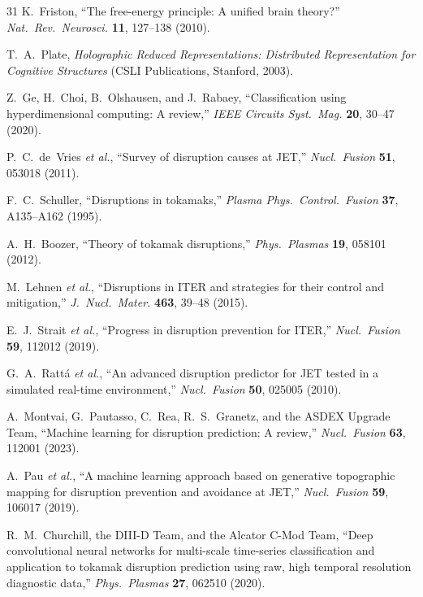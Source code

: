 \documentclass[twocolumn,prl,aps,superscriptaddress,floatfix]{revtex4-2}
\begin{document}
\begin{thebibliography}{31}
K.~Friston,
``The free-energy principle: A unified brain theory?''
\textit{Nat.\ Rev.\ Neurosci.} \textbf{11}, 127--138 (2010).

T.~A.~Plate,
\textit{Holographic Reduced Representations: Distributed Representation for Cognitive Structures}
(CSLI Publications, Stanford, 2003).

Z.~Ge, H.~Choi, B.~Olshausen, and J.~Rabaey,
``Classification using hyperdimensional computing: A review,''
\textit{IEEE Circuits Syst.\ Mag.} \textbf{20}, 30--47 (2020).

P.~C.~de~Vries \textit{et al.},
``Survey of disruption causes at JET,''
\textit{Nucl.\ Fusion} \textbf{51}, 053018 (2011).

F.~C.~Schuller,
``Disruptions in tokamaks,''
\textit{Plasma Phys.\ Control.\ Fusion} \textbf{37}, A135--A162 (1995).

A.~H.~Boozer,
``Theory of tokamak disruptions,''
\textit{Phys.\ Plasmas} \textbf{19}, 058101 (2012).

M.~Lehnen \textit{et al.},
``Disruptions in ITER and strategies for their control and mitigation,''
\textit{J.\ Nucl.\ Mater.} \textbf{463}, 39--48 (2015).

E.~J.~Strait \textit{et al.},
``Progress in disruption prevention for ITER,''
\textit{Nucl.\ Fusion} \textbf{59}, 112012 (2019).

G.~A.~Ratt\'a \textit{et al.},
``An advanced disruption predictor for JET tested in a simulated real-time environment,''
\textit{Nucl.\ Fusion} \textbf{50}, 025005 (2010).

A.~Montvai, G.~Pautasso, C.~Rea, R.~S.~Granetz, and the ASDEX Upgrade Team,
``Machine learning for disruption prediction: A review,''
\textit{Nucl.\ Fusion} \textbf{63}, 112001 (2023).

A.~Pau \textit{et al.},
``A machine learning approach based on generative topographic mapping for disruption prevention and avoidance at JET,''
\textit{Nucl.\ Fusion} \textbf{59}, 106017 (2019).

R.~M.~Churchill, the DIII-D Team, and the Alcator C-Mod Team,
``Deep convolutional neural networks for multi-scale time-series classification and application to tokamak disruption prediction using raw, high temporal resolution diagnostic data,''
\textit{Phys.\ Plasmas} \textbf{27}, 062510 (2020).


\end{thebibliography}
\end{document}
